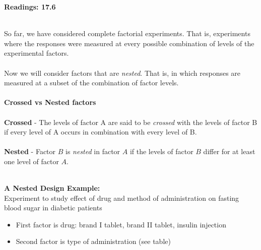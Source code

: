 \begin{center}\large\textbf{Readings: 17.6}\\
\normalsize \end{center}
\large ~\hrulefill
~\\
So far, we have considered complete factorial experiments.  That is, experiments where the responses were measured at every possible combination of levels of the experimental factors.  \\~\\
Now we will consider factors that are \textit{nested}.  That is, in which responses are measured at a subset of the combination of factor levels.  \\~\\
\textbf{Crossed vs Nested factors}\\~\\
\textbf{Crossed} - The levels of factor A are said to be \textit{crossed} with the levels of factor B if every level of A occurs in combination with every level of B.\\~\\
\textbf{Nested} - Factor $B$ is \textit{nested} in factor $A$ if the levels of factor $B$ differ for at least one level of factor $A$.\\~\\

\newpage

\textbf{A Nested Design Example:}\\
Experiment to study effect of drug and method of administration on fasting blood sugar in diabetic patients
\begin{itemize}
\item First factor is drug: brand I tablet, brand II tablet, insulin injection 
\item Second factor is type of administration (see table)
\end{itemize}

